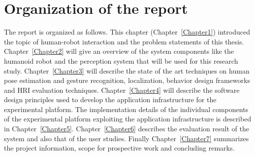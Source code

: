 \section{Organization of the report}
\label{sec:organization}
The report is organized as follows. This chapter (Chapter~\ref{Chapter1}) introduced the topic of human-robot interaction and the problem statements of this thesis. Chapter~\ref{Chapter2} will give an overview of the system components like the humanoid robot and the perception system that will be used for this research study. Chapter~\ref{Chapter3} will describe the state of the art techniques on human pose estimation and gesture recognition, localization, behavior design frameworks and HRI evaluation techniques. Chapter~\ref{Chapter4} will describe the software design principles used to develop the application infrastructure for the experimental platform. The implementation details of the individual components of the experimental platform exploiting the application infrastructure is described in Chapter~\ref{Chapter5}. Chapter~\ref{Chapter6} describes the evaluation result of the system and also that of the user studies. Finally Chapter~\ref{Chapter7} summarizes the project information, scope for prospective work and concluding remarks.